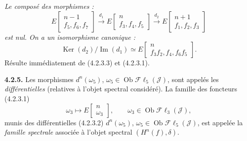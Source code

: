 \clearpage
{}%
\begingroup\small\setlength{\parskip}{0pt}\setlength{\emergencystretch}{2.5em}
\noindent\textit{Le composé des morphismes :}
\[
E\!\begin{bmatrix}n-1\\ f_5,f_6,f_7\end{bmatrix}
\xrightarrow{d_1}
E\!\begin{bmatrix}n\\ f_3,f_4,f_5\end{bmatrix}
\xrightarrow{d_2}
E\!\begin{bmatrix}n+1\\ f_1,f_2,f_3\end{bmatrix}
\]
\textit{est nul. On a un isomorphisme canonique :}
\[
\operatorname{Ker}(d_2)\big/\operatorname{Im}(d_1)
\simeq
E\!\begin{bmatrix}n\\ f_3f_2,f_4,f_6f_5\end{bmatrix}.
\tag{4.2.4.1}
\]
Résulte immédiatement de (4.2.3.3) et (4.2.3.1).

\medskip\noindent\textbf{4.2.5.}
Les morphismes $d^n(\omega_5)$,
$\omega_5\in\operatorname{Ob}\mathcal{F}\ell_5(\mathcal J)$, sont appelés
les \textit{différentielles} (relatives à l'objet spectral considéré). La
famille des foncteurs (4.2.3.1)
\[
\omega_3\longmapsto
E\!\begin{bmatrix}n\\ \omega_3\end{bmatrix},
\qquad
\omega_3\in\operatorname{Ob}\mathcal{F}\ell_3(\mathcal J),
\]
munis des différentielles (4.2.3.2) $d^n(\omega_5)$,
$\omega_5\in\operatorname{Ob}\mathcal{F}\ell_5(\mathcal J)$, est appelée
la \textit{famille spectrale} associée à l'objet spectral
$(H^n(f),\delta)$.

